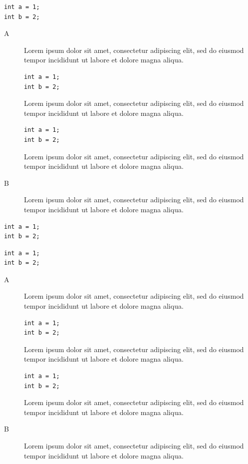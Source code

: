 \documentclass[a4paper,11pt]{article}
\begin{document}
\begin{lstlisting}[caption={Hello World!},captionpos=b]
int a = 1;
int b = 2;
\end{lstlisting}

\begin{description}
\item[A]
Lorem ipsum dolor sit amet, consectetur adipiscing elit, sed do eiusmod tempor incididunt ut labore et dolore magna aliqua.
\begin{lstlisting}[caption={Hello World!}]
int a = 1;
int b = 2;
\end{lstlisting}
Lorem ipsum dolor sit amet, consectetur adipiscing elit, sed do eiusmod tempor incididunt ut labore et dolore magna aliqua.
\begin{lstlisting}[caption={Hello World!},captionpos=b]
int a = 1;
int b = 2;
\end{lstlisting}
Lorem ipsum dolor sit amet, consectetur adipiscing elit, sed do eiusmod tempor incididunt ut labore et dolore magna aliqua.
\item[B]
Lorem ipsum dolor sit amet, consectetur adipiscing elit, sed do eiusmod tempor incididunt ut labore et dolore magna aliqua.
\end{description}

\clearpage
\captionsetup{box=colorbox,boxcolor=orange!20}

\begin{lstlisting}[caption={Hello World!}]
int a = 1;
int b = 2;
\end{lstlisting}

\begin{lstlisting}[caption={Hello World!},captionpos=b]
int a = 1;
int b = 2;
\end{lstlisting}

\begin{description}
\item[A]
Lorem ipsum dolor sit amet, consectetur adipiscing elit, sed do eiusmod tempor incididunt ut labore et dolore magna aliqua.
\begin{lstlisting}[caption={Hello World!}]
int a = 1;
int b = 2;
\end{lstlisting}
Lorem ipsum dolor sit amet, consectetur adipiscing elit, sed do eiusmod tempor incididunt ut labore et dolore magna aliqua.
\begin{lstlisting}[caption={Hello World!},captionpos=b]
int a = 1;
int b = 2;
\end{lstlisting}
Lorem ipsum dolor sit amet, consectetur adipiscing elit, sed do eiusmod tempor incididunt ut labore et dolore magna aliqua.
\item[B]
Lorem ipsum dolor sit amet, consectetur adipiscing elit, sed do eiusmod tempor incididunt ut labore et dolore magna aliqua.
\end{description}
\end{document}
